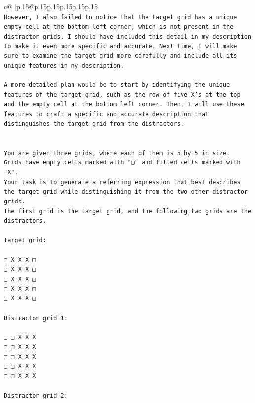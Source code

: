 \documentclass{article}
\begin{document}
{\begin{supertabular}{c@{$\;$}|p{.15\linewidth}@{}p{.15\linewidth}p{.15\linewidth}p{.15\linewidth}p{.15\linewidth}p{.15\linewidth}}
{{{\\ 
\texttt{However, I also failed to notice that the target grid has a unique empty cell at the bottom left corner, which is not present in the distractor grids. I should have included this detail in my description to make it even more specific and accurate. Next time, I will make sure to examine the target grid more carefully and include all its unique features in my description. } \\
\\ 
\texttt{A more detailed plan would be to start by identifying the unique features of the target grid, such as the row of five X's at the top and the empty cell at the bottom left corner. Then, I will use these features to craft a specific and accurate description that distinguishes the target grid from the distractors.} \\
\\ 
\\ 
\texttt{You are given three grids, where each of them is 5 by 5 in size.} \\
\texttt{Grids have empty cells marked with "▢" and filled cells marked with "X".} \\
\texttt{Your task is to generate a referring expression that best describes the target grid while distinguishing it from the two other distractor grids.} \\
\texttt{The first grid is the target grid, and the following two grids are the distractors.} \\
\\ 
\texttt{Target grid:} \\
\\ 
\texttt{□ X X X □} \\
\texttt{□ X X X □} \\
\texttt{□ X X X □} \\
\texttt{□ X X X □} \\
\texttt{□ X X X □} \\
\\ 
\texttt{Distractor grid 1:} \\
\\ 
\texttt{□ □ X X X} \\
\texttt{□ □ X X X} \\
\texttt{□ □ X X X} \\
\texttt{□ □ X X X} \\
\texttt{□ □ X X X} \\
\\ 
\texttt{Distractor grid 2:} \\
\\ 
}}}
\end{supertabular}}
\end{document}
